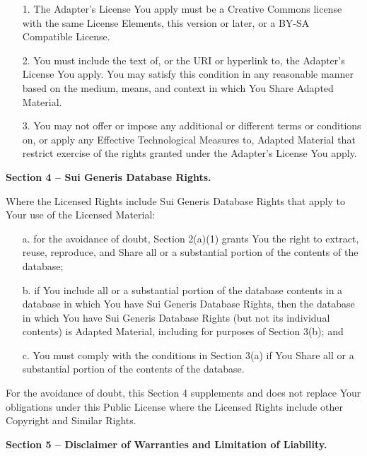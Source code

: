 \begin{itemize}
    \begin{itemize}
        \item[1.] The Adapter's License You apply must be a Creative Commons license with the same License Elements, this version or later, or a BY-SA Compatible License.
        \item[2.] You must include the text of, or the URI or hyperlink to, the Adapter's License You apply. You may satisfy this condition in any reasonable manner based on the medium, means, and context in which You Share Adapted Material.
        \item[3.] You may not offer or impose any additional or different terms or conditions on, or apply any Effective Technological Measures to, Adapted Material that restrict exercise of the rights granted under the Adapter's License You apply.
    \end{itemize}
\end{itemize}

\begin{center}
    \textbf{Section 4 -- Sui Generis Database Rights.}
\end{center}

Where the Licensed Rights include Sui Generis Database Rights that apply to Your use of the Licensed Material:

\begin{itemize}
    \item[a.] for the avoidance of doubt, Section 2(a)(1) grants You the right to extract, reuse, reproduce, and Share all or a substantial portion of the contents of the database;
    \item[b.] if You include all or a substantial portion of the database contents in a database in which You have Sui Generis Database Rights, then the database in which You have Sui Generis Database Rights (but not its individual contents) is Adapted Material, including for purposes of Section 3(b); and
    \item[c.] You must comply with the conditions in Section 3(a) if You Share all or a substantial portion of the contents of the database.
\end{itemize}

For the avoidance of doubt, this Section 4 supplements and does not replace Your obligations under this Public License where the Licensed Rights include other Copyright and Similar Rights.

\begin{center}
    \textbf{Section 5 -- Disclaimer of Warranties and Limitation of Liability.}
\end{center}

